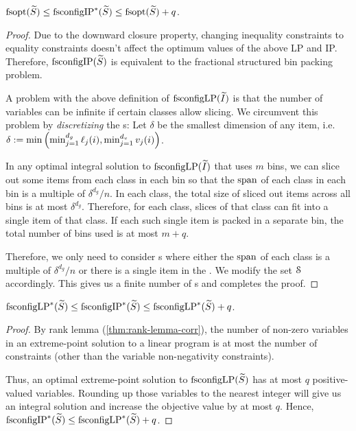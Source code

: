 \begin{lemma}
\label{thm:fcip-eq-fopt}
$\operatorname{fsopt}(\widetilde{S}) \le \operatorname{fsconfigIP}^*(\widetilde{S}) \le \operatorname{fsopt}(\widetilde{S}) + q$.
\end{lemma}
\begin{proof}
Due to the downward closure property, changing inequality constraints to equality constraints
doesn't affect the optimum values of the above LP and IP.
Therefore, $\operatorname{fsconfigIP}(\widetilde{S})$ is equivalent to the fractional structured bin packing problem.

A problem with the above definition of $\operatorname{fsconfigLP}(\widetilde{I})$ is that
the number of variables can be infinite if certain classes allow slicing.
We circumvent this problem by \emph{discretizing} the \config{}s:
Let $\delta$ be the smallest dimension of any item, i.e.
$\delta := \min\left(\min_{j=1}^{d_g} \ell_j(i), \min_{j=1}^{d_v} v_j(i)\right)$.

In any optimal integral solution to $\operatorname{fsconfigLP}(\widetilde{I})$ that uses $m$ bins,
we can slice out some items from each class in each bin so that
the $\operatorname{span}$ of each class in each bin is a multiple of $\delta^{d_g}/n$.
In each class, the total size of sliced out items across all bins is at most $\delta^{d_g}$.
Therefore, for each class, slices of that class can fit into a single item of that class.
If each such single item is packed in a separate bin,
the total number of bins used is at most $m + q$.

Therefore, we only need to consider \config{}s where either the $\operatorname{span}$ of each class
is a multiple of $\delta^{d_g}/n$ or there is a single item in the \config.
We modify the set $\mathcal{S}$ accordingly.
This gives us a finite number of \config{}s and completes the proof.
\end{proof}

\begin{lemma}
\label{thm:fclp-rank-lemma}
$\operatorname{fsconfigLP}^*(\widetilde{S}) \le \operatorname{fsconfigIP}^*(\widetilde{S}) \le \operatorname{fsconfigLP}^*(\widetilde{S}) + q$.
\end{lemma}
\begin{proof}
By rank lemma (\cref{thm:rank-lemma-corr}), the number of
non-zero variables in an extreme-point solution
to a linear program is at most the number of constraints (other than the
variable non-negativity constraints).

Thus, an optimal extreme-point solution to $\operatorname{fsconfigLP}(\widetilde{S})$ has at most $q$
positive-valued variables. Rounding up those variables to the nearest integer
will give us an integral solution and increase the objective value by at most $q$.
Hence, $\operatorname{fsconfigIP}^*(\widetilde{S}) \le \operatorname{fsconfigLP}^*(\widetilde{S}) + q$.
\end{proof}

